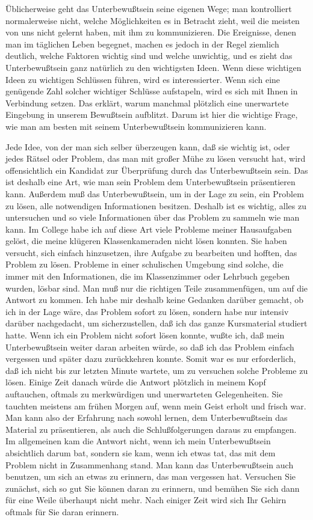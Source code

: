 Üblicherweise geht das Unterbewußtsein seine eigenen Wege; man kontrolliert normalerweise nicht, welche Möglichkeiten es in Betracht zieht, weil die meisten von uns nicht gelernt haben, mit ihm zu kommunizieren.
Die Ereignisse, denen man im täglichen Leben begegnet, machen es jedoch in der Regel ziemlich deutlich, welche Faktoren wichtig sind und welche unwichtig, und es zieht das Unterbewußtsein ganz natürlich zu den wichtigsten Ideen.
Wenn diese wichtigen Ideen zu wichtigen Schlüssen führen, wird es interessierter.
Wenn sich eine genügende Zahl solcher wichtiger Schlüsse aufstapeln, wird es sich mit Ihnen in Verbindung setzen.
Das erklärt, warum manchmal plötzlich eine unerwartete Eingebung in unserem Bewußtsein aufblitzt.
Darum ist hier die wichtige Frage, wie man am besten mit seinem Unterbewußtsein kommunizieren kann.

Jede Idee, von der man sich selber überzeugen kann, daß sie wichtig ist, oder jedes Rätsel oder Problem, das man mit großer Mühe zu lösen versucht hat, wird offensichtlich ein Kandidat zur Überprüfung durch das Unterbewußtsein sein.
Das ist deshalb eine Art, wie man sein Problem dem Unterbewußtsein präsentieren kann.
Außerdem muß das Unterbewußtsein, um in der Lage zu sein, ein Problem zu lösen, alle notwendigen Informationen besitzen.
Deshalb ist es wichtig, alles zu untersuchen und so viele Informationen über das Problem zu sammeln wie man kann.
Im College habe ich auf diese Art viele Probleme meiner Hausaufgaben gelöst, die meine klügeren Klassenkameraden nicht lösen konnten.
Sie haben versucht, sich einfach hinzusetzen, ihre Aufgabe zu bearbeiten und hofften, das Problem zu lösen.
Probleme in einer schulischen Umgebung sind solche, die immer mit den Informationen, die im Klassenzimmer oder Lehrbuch gegeben wurden, lösbar sind.
Man muß nur die richtigen Teile zusammenfügen, um auf die Antwort zu kommen.
Ich habe mir deshalb keine Gedanken darüber gemacht, ob ich in der Lage wäre, das Problem sofort zu lösen, sondern habe nur intensiv darüber nachgedacht, um sicherzustellen, daß ich das ganze Kursmaterial studiert hatte.
Wenn ich ein Problem nicht sofort lösen konnte, wußte ich, daß mein Unterbewußtsein weiter daran arbeiten würde, so daß ich das Problem einfach vergessen und später dazu zurückkehren konnte.
Somit war es nur erforderlich, daß ich nicht bis zur letzten Minute wartete, um zu versuchen solche Probleme zu lösen.
Einige Zeit danach würde die Antwort plötzlich in meinem Kopf auftauchen, oftmals zu merkwürdigen und unerwarteten Gelegenheiten.
Sie tauchten meistens am frühen Morgen auf, wenn mein Geist erholt und frisch war.
Man kann also der Erfahrung nach sowohl lernen, dem Unterbewußtsein das Material zu präsentieren, als auch die Schlußfolgerungen daraus zu empfangen.
Im allgemeinen kam die Antwort nicht, wenn ich mein Unterbewußtsein absichtlich darum bat, sondern sie kam, wenn ich etwas tat, das mit dem Problem nicht in Zusammenhang stand.
Man kann das Unterbewußtsein auch benutzen, um sich an etwas zu erinnern, das man vergessen hat.
Versuchen Sie zunächst, sich so gut Sie können daran zu erinnern, und bemühen Sie sich dann für eine Weile überhaupt nicht mehr.
Nach einiger Zeit wird sich Ihr Gehirn oftmals für Sie daran erinnern.

